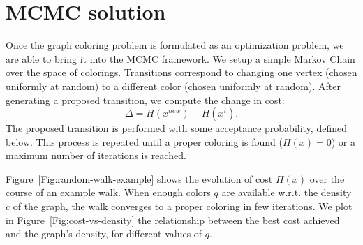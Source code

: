 \documentclass{article}
\begin{document}
  \section*{MCMC solution}
  Once the graph coloring problem is formulated as an optimization problem, we are able to bring it into the MCMC framework. We setup a simple Markov Chain over the space of colorings. Transitions correspond to changing one vertex (chosen uniformly at random) to a different color (chosen uniformly at random). After generating a proposed transition, we compute the change in cost:
  \[
    \Delta = H(x^{new}) - H(x^t).
  \]
  The proposed transition is performed with some acceptance probability, defined below. This process is repeated until a proper coloring is found ($H(x) = 0$) or a maximum number of iterations is reached.

  Figure~\ref{Fig:random-walk-example} shows the evolution of cost $H(x)$ over the course of an example walk. When enough colors $q$ are available w.r.t. the density $c$ of the graph, the walk converges to a proper coloring in few iterations. We plot in Figure~\ref{Fig:cost-vs-density} the relationship between the best cost achieved and the graph's density, for different values of $q$.
\end{document}
